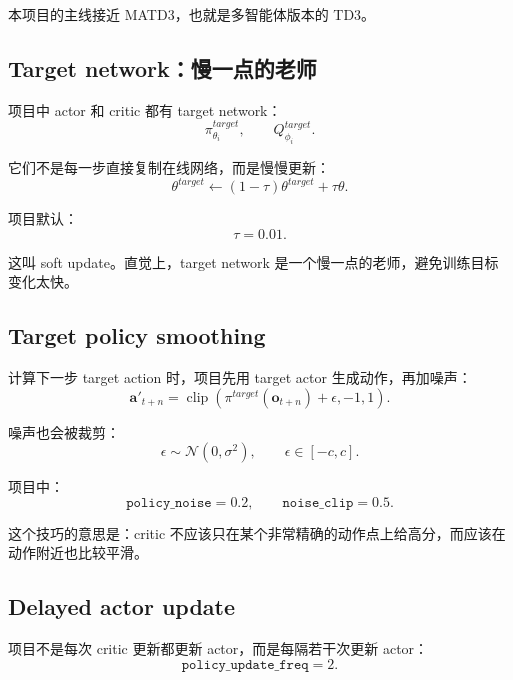 \documentclass[UTF8,zihao=-4]{ctexart}
\begin{document}
本项目的主线接近 MATD3，也就是多智能体版本的 TD3。

\subsection{Target network：慢一点的老师}

项目中 actor 和 critic 都有 target network：
\begin{equation}
\pi_{\theta_i}^{target},
\qquad
Q_{\phi_i}^{target}.
\end{equation}

它们不是每一步直接复制在线网络，而是慢慢更新：
\begin{equation}
\theta^{target}
\leftarrow
(1-\tau)\theta^{target}
+\tau\theta.
\end{equation}

项目默认：
\begin{equation}
\tau=0.01.
\end{equation}

这叫 soft update。直觉上，target network 是一个慢一点的老师，避免训练目标变化太快。

\subsection{Target policy smoothing}

计算下一步 target action 时，项目先用 target actor 生成动作，再加噪声：
\begin{equation}
\bm{a}'_{t+n}
=
\operatorname{clip}
\left(
\pi^{target}(\bm{o}_{t+n})+\epsilon,
-1,1
\right).
\end{equation}

噪声也会被裁剪：
\begin{equation}
\epsilon\sim\mathcal{N}(0,\sigma^2),
\qquad
\epsilon\in[-c,c].
\end{equation}

项目中：
\begin{equation}
\texttt{policy\_noise}=0.2,\qquad
\texttt{noise\_clip}=0.5.
\end{equation}

这个技巧的意思是：critic 不应该只在某个非常精确的动作点上给高分，而应该在动作附近也比较平滑。

\subsection{Delayed actor update}

项目不是每次 critic 更新都更新 actor，而是每隔若干次更新 actor：
\begin{equation}
\texttt{policy\_update\_freq}=2.
\end{equation}
\end{document}
